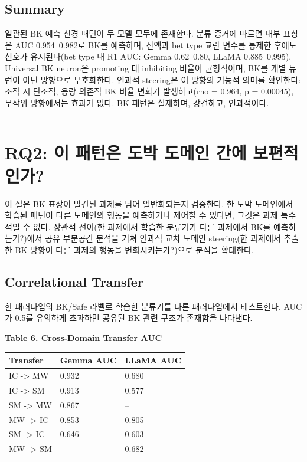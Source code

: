 \documentclass[11pt,a4paper]{article}
\begin{document}
\subsection{Summary}

일관된 BK 예측 신경 패턴이 두 모델 모두에 존재한다. 분류 증거에 따르면 내부 표상은 AUC 0.954~0.982로 BK를 예측하며, 잔액과 bet type 교란 변수를 통제한 후에도 신호가 유지된다(bet type 내 R1 AUC: Gemma 0.62~0.80, LLaMA 0.885~0.995). Universal BK neuron은 promoting 대 inhibiting 비율이 균형적이며, BK를 개별 뉴런이 아닌 방향으로 부호화한다. 인과적 steering은 이 방향의 기능적 의미를 확인한다: 조작 시 단조적, 용량 의존적 BK 비율 변화가 발생하고(rho = 0.964, p = 0.00045), 무작위 방향에서는 효과가 없다. BK 패턴은 실재하며, 강건하고, 인과적이다.

\bigskip\hrule\bigskip

\section{RQ2: 이 패턴은 도박 도메인 간에 보편적인가?}

이 절은 BK 표상이 발견된 과제를 넘어 일반화되는지 검증한다. 한 도박 도메인에서 학습된 패턴이 다른 도메인의 행동을 예측하거나 제어할 수 있다면, 그것은 과제 특수적일 수 없다. 상관적 전이(한 과제에서 학습한 분류기가 다른 과제에서 BK를 예측하는가?)에서 공유 부분공간 분석을 거쳐 인과적 교차 도메인 steering(한 과제에서 추출한 BK 방향이 다른 과제의 행동을 변화시키는가?)으로 분석을 확대한다.

\subsection{Correlational Transfer}

한 패러다임의 BK/Safe 라벨로 학습한 분류기를 다른 패러다임에서 테스트한다. AUC가 0.5를 유의하게 초과하면 공유된 BK 관련 구조가 존재함을 나타낸다.

\textbf{Table 6. Cross-Domain Transfer AUC}

\begin{table}[H]
\centering
\small
\begin{tabular}{|l|l|l|}
\hline
Transfer & Gemma AUC & LLaMA AUC \\
\hline
IC -> MW & 0.932 & 0.680 \\
IC -> SM & 0.913 & 0.577 \\
SM -> MW & 0.867 & -- \\
MW -> IC & 0.853 & 0.805 \\
SM -> IC & 0.646 & 0.603 \\
MW -> SM & -- & 0.682 \\
\hline
\end{tabular}
\end{table}
\end{document}
